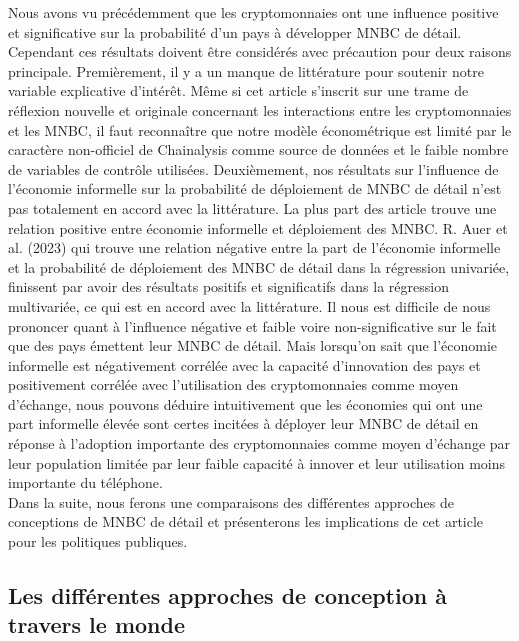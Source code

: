 \documentclass[12pt]{article}
\begin{document}
Nous avons vu précédemment que les cryptomonnaies ont une influence positive et significative sur la probabilité d'un pays à développer MNBC de détail. Cependant ces résultats doivent être considérés avec précaution pour deux raisons principale. Premièrement, il y a un manque de littérature pour soutenir notre variable explicative d'intérêt. Même si cet article s'inscrit sur une trame de réflexion nouvelle et originale concernant les interactions entre les cryptomonnaies et les MNBC, il faut reconnaître que notre modèle économétrique est limité par le caractère non-officiel de Chainalysis comme source de données et le faible nombre de variables de contrôle utilisées. Deuxièmement, nos résultats sur l'influence de l'économie informelle sur la probabilité de déploiement de MNBC de détail n'est pas totalement en accord avec la littérature. La plus part des article trouve une relation positive entre économie informelle et déploiement des MNBC. R. Auer et al. (2023) qui trouve une relation négative entre la part de l'économie informelle et la probabilité de déploiement des MNBC de détail dans la régression univariée, finissent par avoir des résultats positifs et significatifs dans la régression multivariée, ce qui est en accord avec la littérature. Il nous est difficile de nous prononcer quant à l'influence négative et faible voire non-significative sur le fait que des pays émettent leur MNBC de détail. Mais lorsqu'on sait que l'économie informelle est négativement corrélée avec la capacité d'innovation des pays et positivement corrélée avec l'utilisation des cryptomonnaies comme moyen d'échange, nous pouvons déduire intuitivement que les économies qui ont une part informelle élevée sont certes incitées à déployer leur MNBC de détail en réponse à l'adoption importante des cryptomonnaies comme moyen d'échange par leur population limitée par leur faible capacité à innover et leur utilisation moins importante du téléphone. \\

Dans la suite, nous ferons une comparaisons des différentes approches de conceptions de MNBC de détail et présenterons les implications de cet article pour les politiques publiques.

\subsection{Les différentes approches de conception à travers le monde}
\end{document}
